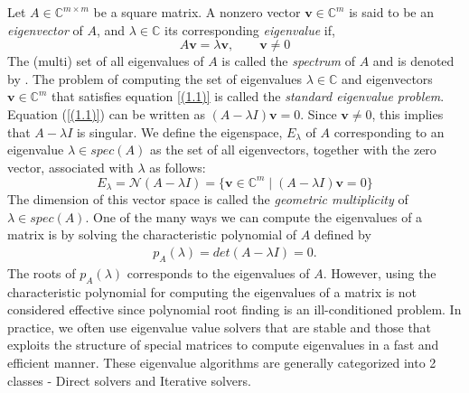 \documentclass[12pt,gsu,online,openany,singleside,hidelinks]{gsudiss}
\newcommand{\comm}[1]{\added[comment={#1}]{}}
\newcommand{\rep}[2]{\replaced{#1}{#2}}
\begin{document}
\comm{As with norms, you can assume your reader knows this.  You don't really need this section.  If there is notation you define here, you should define it elsewhere when it is first used.}  Let $A \in \mathbb{C}^{m\times m}$ be a square matrix. A nonzero vector $\mathbf{v} \in \mathbb{C}^m$ is said to be an \textit{eigenvector} of $A$, and $\lambda \in \mathbb{C}$ its corresponding \textit{eigenvalue} if,
\begin{equation}\label{(1.1)}
	A\mathbf{v} = \lambda \mathbf{v}, \qquad \mathbf{v} \neq 0
\end{equation}
The (multi) set of all eigenvalues of $A$ is called the \textit{spectrum} of $A$ and is denoted by \rep{$\text{spec}(A)$}{$spec(A)$}.\comm{Function names should not be in italics.  This is also true for det and tr.  An exception might by if you are using a document style in which ordinary text is in italics in theorems or definitions.  So the rule is that function names should be in the same style as ordinary text.}
The problem of computing the set of eigenvalues $\lambda \in \mathbb{C}$ and eigenvectors $\mathbf{v} \in \mathbb{C}^{m}$ that satisfies equation \ref{(1.1)} is called the \textit{standard eigenvalue problem}. \\
Equation (\ref{(1.1)}) can be written as $(A-\lambda I)\mathbf{v} = 0$. Since $\mathbf{v}\neq0$, this implies that $A-\lambda I$ is singular. We define the eigenspace, $E_\lambda$ of $A$ corresponding to an eigenvalue $\lambda \in spec(A)$ as the set of all eigenvectors, together with the zero vector, associated with $\lambda$ as follows:
\begin{equation}
	E_\lambda = \mathcal{N}(A-\lambda I) = \{\mathbf{v} \in \mathbb{C}^{m} \mid (A - \lambda I)\mathbf{v} = 0\}
\end{equation}
The dimension of this vector space is called the \textit{geometric multiplicity} of $\lambda \in spec(A)$.
One of the many ways we can compute the eigenvalues of a matrix is by solving the characteristic polynomial of $A$ defined by
\begin{align*}
	p_A (\lambda) = det(A - \lambda I)  = 0.
\end{align*}
The roots of $p_A (\lambda)$ corresponds to the eigenvalues of $A$. However, using the characteristic polynomial for computing the eigenvalues of a matrix is not considered effective since polynomial root finding is an ill-conditioned problem. In practice, we often use eigenvalue value solvers that are stable and those that exploits the structure of special matrices to compute eigenvalues in a fast and efficient manner. These eigenvalue algorithms are generally categorized into 2 classes - Direct solvers and Iterative solvers.
\end{document}
